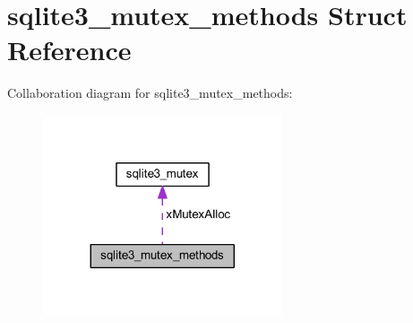 \hypertarget{structsqlite3__mutex__methods}{\section{sqlite3\-\_\-mutex\-\_\-methods Struct Reference}
\label{structsqlite3__mutex__methods}
}


Collaboration diagram for sqlite3\-\_\-mutex\-\_\-methods\-:\nopagebreak
\begin{figure}[H]
\begin{center}
\leavevmode
\includegraphics[width=200pt]{structsqlite3__mutex__methods__coll__graph}
\end{center}
\end{figure}
